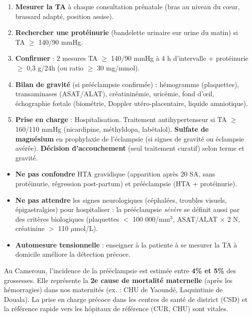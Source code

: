 \documentclass[11pt]{article}
\begin{document}
\begin{methode}
\begin{enumerate}
    \item \textbf{Mesurer la TA} à chaque consultation prénatale (bras au niveau du cœur, brassard adapté, position assise).
    \item \textbf{Rechercher une protéinurie} (bandelette urinaire sur urine du matin) si TA $\ge$ 140/90 mmHg.
    \item \textbf{Confirmer} : 2 mesures TA $\ge$ 140/90 mmHg à 4 h d'intervalle + protéinurie $\ge$ 0,3 g/24h (ou ratio $\ge$ 30 mg/mmol).
    \item \textbf{Bilan de gravité} (si prééclampsie confirmée) : hémogramme (plaquettes), transaminases (ASAT/ALAT), créatininémie, uricémie, fond d'œil, échographie fœtale (biométrie, Doppler utéro-placentaire, liquide amniotique).
    \item \textbf{Prise en charge} : Hospitalisation. Traitement antihypertenseur si TA $\ge$ 160/110 mmHg (nicardipine, méthyldopa, labétalol). \textbf{Sulfate de magnésium} en prophylaxie de l'éclampsie (si signes de gravité ou éclampsie avérée). \textbf{Décision d'accouchement} (seul traitement curatif) selon terme et gravité.
\end{enumerate}
\end{methode}

\begin{attention}
\begin{itemize}
    \item \textbf{Ne pas confondre} HTA gravidique (apparition après 20 SA, sans protéinurie, régression post-partum) et prééclampsie (HTA + protéinurie).
    \item \textbf{Ne pas attendre} les signes neurologiques (céphalées, troubles visuels, épigastralgies) pour hospitaliser : la prééclampsie \emph{sévère} se définit aussi par des critères biologiques (plaquettes $<$ 100 000/mm$^3$, ASAT/ALAT $\times$ 2 N, créatinine $>$ 110 $\mu$mol/L).
    \item \textbf{Automesure tensionnelle} : enseigner à la patiente à se mesurer la TA à domicile améliore la détection précoce.
\end{itemize}
\end{attention}

\begin{exemplebox}
Au Cameroun, l'incidence de la prééclampsie est estimée entre \textbf{4\% et 5\%} des grossesses. Elle représente la \textbf{2e cause de mortalité maternelle} (après les hémorragies) dans nos maternités (ex. : CHU de Yaoundé, Laquintinie de Douala). La prise en charge précoce dans les centres de santé de district (CSD) et la référence rapide vers les hôpitaux de référence (CUR, CHU) sont vitales.
\end{exemplebox}
\end{document}
